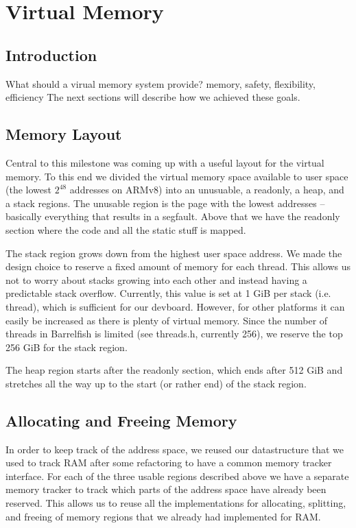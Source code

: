 \chapter{Virtual Memory}

\section{Introduction}
What should a virual memory system provide? memory, safety, flexibility, efficiency
The next sections will describe how we achieved these goals.

\section{Memory Layout}
Central to this milestone was coming up with a useful layout for the virtual memory. To this end
we divided the virtual memory space available to user space (the lowest $2^48$ addresses on ARMv8)
into an unusuable, a readonly, a heap, and
a stack regions. The unusable region is the page with the lowest addresses -- basically everything
that results in a segfault. Above that we have the readonly section where the code and all the static stuff %
is mapped.

The stack region grows down from the highest user space address. We made the design
choice to reserve a fixed amount of memory for each thread. This allows us not to worry
about stacks growing into each other and instead having a predictable stack overflow.
Currently, this value is set at 1 GiB per stack (i.e. thread), which is sufficient for our devboard.
However, for other platforms it can easily be increased as there is plenty of virtual memory.
Since the number of threads in Barrelfish is limited (see threads.h, currently 256), we
reserve the top 256 GiB for the stack region.

The heap region starts after the readonly section, which ends after 512 GiB and stretches all the way
up to the start (or rather end) of the stack region.

\section{Allocating and Freeing Memory}
In order to keep track of the address space, we reused our datastructure that we used to track
RAM after some refactoring to have a common memory tracker interface. For each of the three usable
regions described above we have a separate memory tracker to track which parts of the address space
have already been reserved. This allows us to reuse all the implementations for allocating, splitting,
and freeing of memory regions that we already had implemented for RAM.

